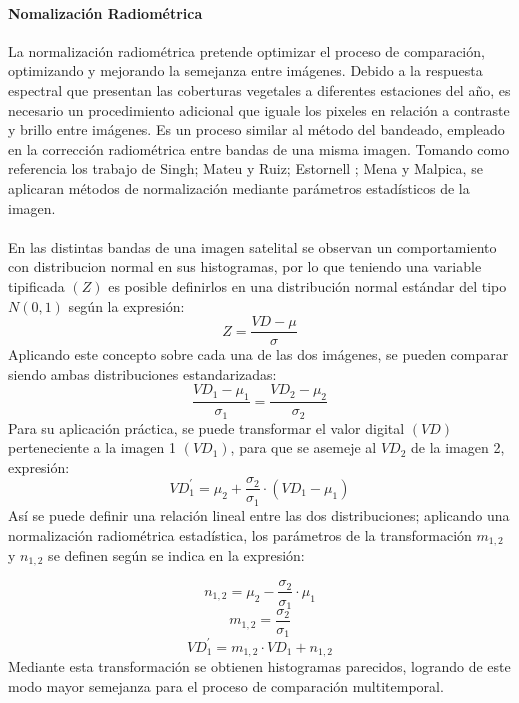 \paragraph{Nomalizaci\'on Radiom\'etrica}
La normalizaci\'on radiom\'etrica pretende optimizar el proceso de comparaci\'on, optimizando y mejorando la semejanza entre im\'agenes. Debido a la respuesta espectral que presentan las coberturas vegetales a diferentes estaciones del a\~{n}o, es necesario un procedimiento adicional que iguale los pixeles en relaci\'on a contraste y brillo entre im\'agenes. Es un proceso similar al m\'etodo del bandeado, empleado en la correcci\'on radiom\'etrica entre bandas de una misma imagen. Tomando como referencia los trabajo de Singh\cite{singh1989review}; Mateu y Ruiz\cite{mateu1999comparacion}; Estornell \cite{estornell2004analisis}; Mena y Malpica\cite{malpica2002fusion}, se aplicaran m\'etodos de normalizaci\'on mediante par\'ametros estad\'isticos de la imagen.\\~\\
En las distintas bandas de una imagen satelital se observan un comportamiento con distribucion normal en sus histogramas, por lo que teniendo una variable tipificada $(Z)$ es posible definirlos en una distribuci\'on normal est\'andar del tipo $ N(0,1) $ seg\'un la expresión:
	\begin{equation}
	Z=\dfrac{VD-\mu}{\sigma}
	\end{equation}
	Aplicando este concepto sobre cada una de las dos im\'agenes, se pueden comparar siendo ambas distribuciones estandarizadas:
	\begin{equation}
	\dfrac{VD_{1}-\mu_{1}}{\sigma_{1}}=\dfrac{VD_{2}-\mu_{2}}{\sigma_{2}}
	\end{equation}
	Para su aplicaci\'on pr\'actica, se puede transformar el valor digital $ (VD) $ perteneciente a la imagen 1 $ (VD_{1}) $, para que se asemeje al $ VD_{2} $ de la imagen 2, expresi\'on:
	\begin{equation}
	VD_{1}^{'}=\mu_{2}+\dfrac{\sigma_{2}}{\sigma_{1}}\cdot(VD_{1}-\mu_{1})
	\end{equation}
	As\'i se puede definir una relaci\'on lineal entre las dos distribuciones; aplicando una normalizaci\'on radiom\'etrica estad\'istica, los par\'ametros de la transformaci\'on $ m_{1,2} $ y $ n_{1,2} $ se definen seg\'un se indica en la expresi\'on:
	
			\begin{equation}
			n_{1,2}=\mu_{2}-\dfrac{\sigma_{2}}{\sigma_{1}}\cdot\mu_{1}
			\end{equation}
					\begin{equation}
					m_{1,2}=\dfrac{\sigma_{2}}{\sigma_{1}}
					\end{equation}
		\begin{equation}
				VD_{1}^{'}=m_{1,2}\cdot VD_{1}+n_{1,2}
		\end{equation}
	Mediante esta transformaci\'on se obtienen histogramas parecidos, logrando de este modo mayor semejanza para el proceso de comparaci\'on multitemporal.
	
